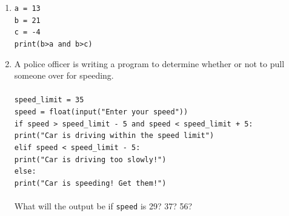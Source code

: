 \documentclass{article}
\begin{document}
\begin{enumerate}
\item \texttt{a = 13\\b = 21\\c = -4\\ print(b>a and b>c)}
\item A police officer is writing a program to determine whether or not to pull someone over for speeding.\\ \\ \texttt{speed\_limit = 35}\\ \texttt{speed = float(input("Enter your speed"))\\if speed > speed\_limit - 5 and speed < speed\_limit + 5:\\ \null\quad print("Car is driving within the speed limit")}\\\texttt{elif speed < speed\_limit - 5:}\\ \null\quad\texttt{print("Car is driving too slowly!")}\\ \texttt{else:}\\ \null\quad\texttt{print("Car is speeding! Get them!")}\\ \\
What will the output be if \texttt{speed} is 29? 37? 56?


\end{enumerate}
\end{document}
